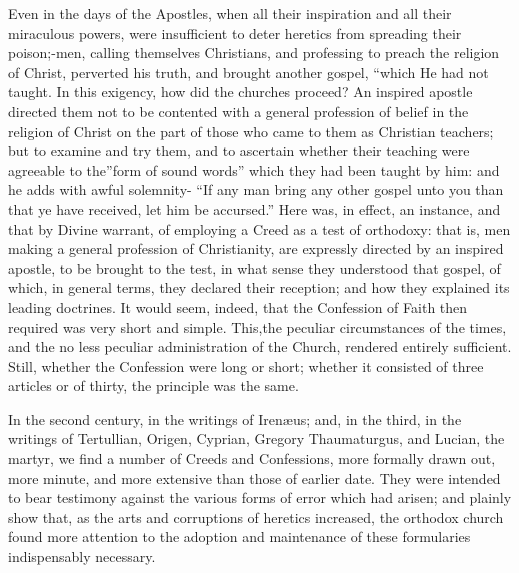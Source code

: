\documentclass[
]{book}
\begin{document}
Even in the days of the Apostles, when all their inspiration and all their miraculous powers, were insufficient to deter heretics from spreading their poison;-men, calling themselves Christians, and professing to preach the religion of Christ, perverted his truth, and brought another gospel, ``which He had not taught. In this exigency, how did the churches proceed? An inspired apostle directed them not to be contented with a general profession of belief in the religion of Christ on the part of those who came to them as Christian teachers; but to examine and try them, and to ascertain whether their teaching were agreeable to the''form of sound words'' which they had been taught by him: and he adds with awful solemnity- ``If any man bring any other gospel unto you than that ye have received, let him be accursed.'' Here was, in effect, an instance, and that by Divine warrant, of employing a Creed as a test of orthodoxy: that is, men making a general profession of Christianity, are expressly directed by an inspired apostle, to be brought to the test, in what sense they understood that gospel, of which, in general terms, they declared their reception; and how they explained its leading doctrines. It would seem, indeed, that the Confession of Faith then required was very short and simple. This,the peculiar circumstances of the times, and the no less peculiar administration of the Church, rendered entirely sufficient. Still, whether the Confession were long or short; whether it consisted of three articles or of thirty, the principle was the same.

In the second century, in the writings of Irenæus; and, in the third, in the writings of Tertullian, Origen, Cyprian, Gregory Thaumaturgus, and Lucian, the martyr, we find a number of Creeds and Confessions, more formally drawn out, more minute, and more extensive than those of earlier date. They were intended to bear testimony against the various forms of error which had arisen; and plainly show that, as the arts and corruptions of heretics increased, the orthodox church found more attention to the adoption and maintenance of these formularies indispensably necessary.
\end{document}
